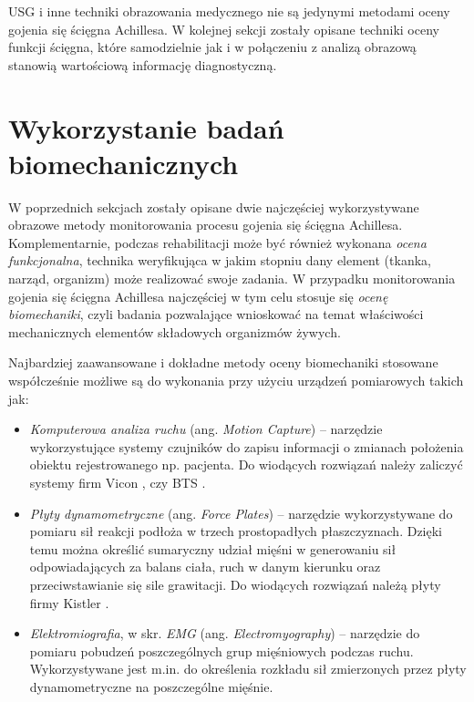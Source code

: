 USG i inne techniki obrazowania medycznego nie są jedynymi metodami oceny gojenia się ścięgna Achillesa. W kolejnej sekcji zostały opisane techniki oceny funkcji ścięgna, które samodzielnie jak i w połączeniu z analizą obrazową stanowią wartościową informację diagnostyczną.

\section{Wykorzystanie badań biomechanicznych}
\label{biomechanika}
W poprzednich sekcjach zostały opisane dwie najczęściej wykorzystywane obrazowe metody monitorowania procesu gojenia się ścięgna Achillesa. Komplementarnie, podczas rehabilitacji może być również wykonana \textit{ocena funkcjonalna}, technika weryfikująca w jakim stopniu dany element (tkanka, narząd, organizm) może realizować swoje zadania. W przypadku monitorowania gojenia się ścięgna Achillesa najczęściej w tym celu stosuje się \textit{ocenę biomechaniki}, czyli badania pozwalające wnioskować na temat właściwości mechanicznych elementów składowych organizmów żywych. 

Najbardziej zaawansowane i dokładne metody oceny biomechaniki stosowane współcześnie możliwe są do wykonania przy użyciu urządzeń pomiarowych takich jak:
\begin{itemize}[noitemsep,nolistsep]
	\item \textit{Komputerowa analiza ruchu} (ang. \textit{Motion Capture}) -- narzędzie wykorzystujące systemy czujników do zapisu informacji o zmianach położenia obiektu rejestrowanego np. pacjenta. Do wiodących rozwiązań należy zaliczyć systemy firm Vicon \cite{Vicon}, czy BTS \cite{BTS}.
	\item \textit{Płyty dynamometryczne} (ang. \textit{Force Plates}) -- narzędzie wykorzystywane \linebreak do pomiaru sił reakcji podłoża w trzech prostopadłych płaszczyznach. Dzięki temu można określić sumaryczny udział mięśni w generowaniu sił odpowiadających za balans ciała, ruch w danym kierunku oraz przeciwstawianie się sile grawitacji. Do wiodących rozwiązań należą płyty firmy Kistler \cite{KISTLER}.
	\item \textit{Elektromiografia}, w skr. \textit{EMG} (ang. \textit{Electromyography}) -- narzędzie do pomiaru pobudzeń poszczególnych grup mięśniowych podczas ruchu. Wykorzystywane jest m.in. do określenia rozkładu sił zmierzonych przez płyty dynamometryczne na poszczególne mięśnie.
\end{itemize}

